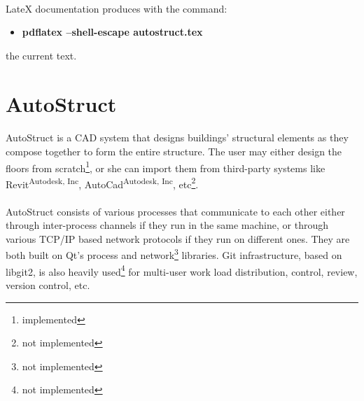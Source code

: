 \paragraph{}
LateX documentation produces with the command:
\begin{itemize}
\item \textbf{pdflatex --shell-escape autostruct.tex}
\end{itemize}
the current text.
\section{AutoStruct}
\paragraph{}
AutoStruct is a CAD system that designs buildings' structural elements as they compose together to form the entire structure. The user may either design the floors from scratch\footnote{implemented}, or she can import them from third-party systems like Revit\textsuperscript{Autodesk, Inc}, AutoCad\textsuperscript{Autodesk, Inc}, etc\footnote{not implemented}. 
\paragraph{}
AutoStruct consists of various processes that communicate to each other either through inter-process channels if they run in the same machine, or through various TCP/IP based network protocols if they run on different ones. They are both built on Qt's process and network\footnote{not implemented} libraries. Git infrastructure, based on libgit2, is also heavily used\footnote{not implemented} for multi-user work load distribution, control, review, version control, etc.
